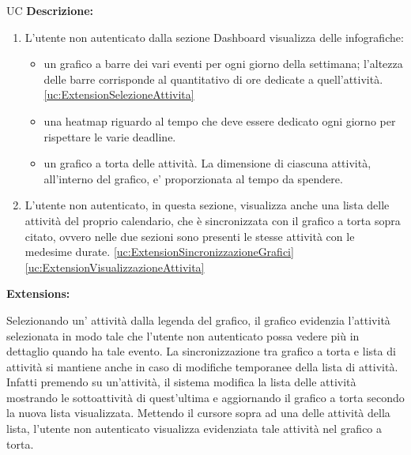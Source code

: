 \begin{listaPersonale}{UC}
    \textbf{Descrizione:}
    \begin{enumerate}
        \item L'utente non autenticato dalla sezione Dashboard visualizza delle infografiche:
              \begin{itemize}
                  \item un grafico a barre dei vari eventi per ogni giorno della settimana; l'altezza delle barre corrisponde al quantitativo di ore dedicate a quell'attività. \ref{uc:ExtensionSelezioneAttivita}
                  \item una heatmap riguardo al tempo che deve essere dedicato ogni giorno per rispettare le varie deadline.
                  \item un grafico a torta delle attività. La dimensione di ciascuna attività, all'interno del grafico, e' proporzionata al tempo da spendere.
              \end{itemize}
        \item L'utente non autenticato, in questa sezione, visualizza anche una lista delle attività del proprio calendario, che è sincronizzata con il grafico a torta sopra citato, ovvero nelle due sezioni sono presenti le stesse attività con le medesime durate. \ref{uc:ExtensionSincronizzazioneGrafici} \ref{uc:ExtensionVisualizzazioneAttivita}
    \end{enumerate}

    \textbf{Extensions:}
    \begin{enumerate}[label=\textbf{[extension \arabic{enumii}]}, ref= \textbf{[extension \arabic{enumii}]}]
         Selezionando un' attività dalla legenda del grafico, il grafico evidenzia l'attività selezionata in modo tale che l'utente non autenticato possa vedere più in dettaglio quando ha tale evento.
         La sincronizzazione tra grafico a torta e lista di attività si mantiene anche in caso di modifiche temporanee della lista di attività. Infatti premendo su un'attività, il sistema modifica la lista delle attività mostrando le sottoattività di quest'ultima e aggiornando il grafico a torta secondo la nuova lista visualizzata.
         Mettendo il cursore sopra ad una delle attività della lista, l'utente non autenticato visualizza evidenziata tale attività nel grafico a torta.
    \end{enumerate}





\end{listaPersonale}
